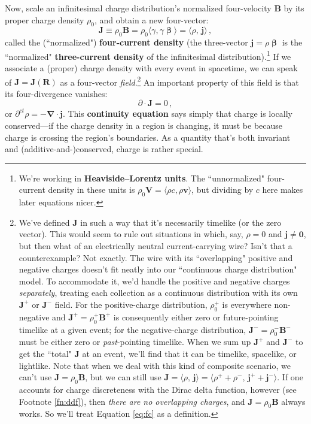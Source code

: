 \documentclass[12pt]{article}
\renewcommand{\vv}[1]{\mathbf{#1}}
\newcommand{\vvbeta}{\bm{\upbeta}}
\newcommand{\del}{\boldsymbol{\nabla}}
\begin{document}
Now, scale an infinitesimal charge distribution's normalized four-velocity $\vv B$ by its proper charge density $\rho_0$, and obtain a new four-vector:
\begin{equation}\label{eq:fc}
\boxed{ \vv J \equiv \rho_0 \vv B = \rho_0 \langle \gamma , \gamma \vvbeta \rangle = \langle \rho, \, \vv j \rangle } \, ,
\end{equation}
called the (``normalized") \textbf{four-current density} (the three-vector $\vv j = \rho \vvbeta$ is the ``normalized" \textbf{three-current density} of the infinitesimal distribution).\footnote{We're working in \textbf{Heaviside--Lorentz units}. The ``unnormalized" four-current density in these units is $\rho_0 \vv V = \langle \rho c, \rho \vv v \rangle$, but dividing by $c$ here makes later equations nicer.} If we associate a (proper) charge density with every event in spacetime, we can speak of $\vv J = \vv J (\vv R)$ as a four-vector \emph{field}.\footnote{We've defined $\vv J$ in such a way that it's necessarily timelike (or the zero vector). This would seem to rule out situations in which, say, $\rho = 0$ and $\vv j \neq \vv 0$, but then what of an electrically neutral current-carrying wire? Isn't that a counterexample? Not exactly. The wire with its ``overlapping" positive and negative charges doesn't fit neatly into our ``continuous charge distribution" model. To accommodate it, we'd handle the positive and negative charges \emph{separately}, treating each collection as a continuous distribution with its own $\vv J^+$ or $\vv J^-$ field. For the positive-charge distribution, $\rho_0^+$ is everywhere non-negative and $\vv J^+ = \rho_0^+ \vv B^+$ is consequently either zero or future-pointing timelike at a given event; for the negative-charge distribution, $\vv J^- = \rho_0^- \vv B^-$ must be either zero or \emph{past}-pointing timelike. When we sum up $\vv J^+$ and $\vv J^-$ to get the ``total" $\vv J$ at an event, we'll find that it can be timelike, spacelike, or lightlike. Note that when we deal with this kind of composite scenario, we can't use $\vv J = \rho_0 \vv B$, but we can still use $\vv J = \langle \rho, \, \vv j \rangle = \langle \rho^+ + \rho^- , \, \vv j^+ + \vv j^- \rangle $. If one accounts for charge discreteness with the Dirac delta function, however (see Footnote \ref{fn:ddf}), then \emph{there are no overlapping charges}, and $\vv J = \rho_0 \vv B$ always works. So we'll treat Equation \ref{eq:fc} as a definition.} An important property of this field is that its four-divergence vanishes:
\begin{equation}\label{eq:con}
\boxed{\partialup \cdot \vv J = 0} \, ,
\end{equation}
or $\partial^{ct} \rho = - \del \cdot \vv j$. This \textbf{continuity equation} says simply that charge is locally conserved---if the charge density in a region is changing, it must be because charge is crossing the region's boundaries. As a quantity that's both invariant and (additive-and-)conserved, charge is rather special.
\end{document}
